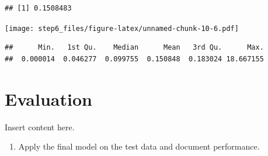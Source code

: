 \documentclass[sigchi]{acmart}
\def\tightlist{}
\newenvironment{Shaded}{\begin{snugshade}}{\end{snugshade}}
\newcommand{\CommentTok}[1]{\textcolor[rgb]{0.56,0.35,0.01}{\textit{#1}}}
\newcommand{\KeywordTok}[1]{\textcolor[rgb]{0.13,0.29,0.53}{\textbf{#1}}}
\newcommand{\NormalTok}[1]{#1}
\newcommand{\OperatorTok}[1]{\textcolor[rgb]{0.81,0.36,0.00}{\textbf{#1}}}
\newcommand{\StringTok}[1]{\textcolor[rgb]{0.31,0.60,0.02}{#1}}
\begin{document}
\begin{verbatim}
## [1] 0.1508483
\end{verbatim}

\begin{Shaded}
\end{Shaded}

\texttt{[image: step6\_files/figure-latex/unnamed-chunk-10-6.pdf]}

\begin{Shaded}
\end{Shaded}

\begin{verbatim}
##      Min.   1st Qu.    Median      Mean   3rd Qu.      Max. 
##  0.000014  0.046277  0.099755  0.150848  0.183024 18.667155
\end{verbatim}

\hypertarget{evaluation}{%
\section{Evaluation}\label{evaluation}}

Insert content here.

\begin{enumerate}
\def\labelenumi{\alph{enumi}.}
\tightlist
\item
  Apply the final model on the test data and document performance.
\end{enumerate}

\begin{Shaded}
\end{Shaded}
\end{document}
